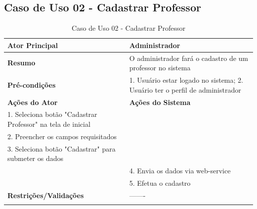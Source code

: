 \subsection{Caso de Uso 02 - Cadastrar Professor}
\label{sc:case2}
\begin{center}
\begin{longtable}{p{8cm}|p{8cm}}
    \hline
    \textbf{Ator Principal} & Administrador \\
    \hline
    \textbf{Resumo} & O administrador fará o cadastro de um professor no sistema \\
    \hline
    \textbf{Pr\'{e}-condi\c{c}\~{o}es} & 1. Usuário estar logado no sistema; 2. Usuário ter o perfil de administrador \\
    \hline
    \textbf{A\c{c}\~{o}es do Ator} & \textbf{A\c{c}\~{o}es do Sistema} \\
    
    \hline
    1. Seleciona botão "Cadastrar Professor" na tela de inicial & \\
    \hline
    2. Preencher os campos requisitados & \\
    \hline
    3. Seleciona botão "Cadastrar" para submeter os dados & \\
    \hline
    & 4. Envia os dados via web-service \\
    \hline
    & 5. Efetua o cadastro \\
    \hline
    \hline
    \textbf{Restri\c{c}\~{o}es/Valida\c{c}\~{o}es} & -------\\
\hline
\caption{Caso de Uso 02 - Cadastrar Professor}
\end{longtable}
\end{center}

